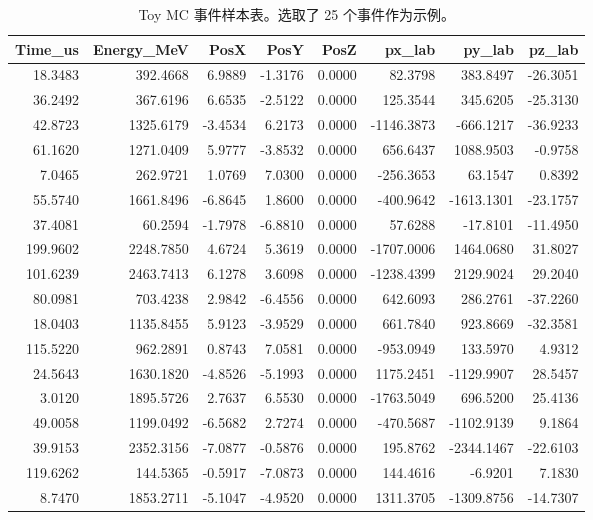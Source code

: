 \documentclass[a4paper,11pt,AutoFakeBold]{ctexart}
\begin{document}
\newpage
\begin{table}[htbp]
\centering
\caption{Toy MC 事件样本表。选取了 25 个事件作为示例。}
\label{event_sample_table}
\begin{tabular}{rrrrrrrr}
\hline
\hline
Time\_us & Energy\_MeV & PosX & PosY & PosZ & px\_lab & py\_lab & pz\_lab \\
\hline
\hline
18.3483 & 392.4668 & 6.9889 & -1.3176 & 0.0000 & 82.3798 & 383.8497 & -26.3051 \\
36.2492 & 367.6196 & 6.6535 & -2.5122 & 0.0000 & 125.3544 & 345.6205 & -25.3130 \\
42.8723 & 1325.6179 & -3.4534 & 6.2173 & 0.0000 & -1146.3873 & -666.1217 & -36.9233 \\
61.1620 & 1271.0409 & 5.9777 & -3.8532 & 0.0000 & 656.6437 & 1088.9503 & -0.9758 \\
7.0465 & 262.9721 & 1.0769 & 7.0300 & 0.0000 & -256.3653 & 63.1547 & 0.8392 \\
55.5740 & 1661.8496 & -6.8645 & 1.8600 & 0.0000 & -400.9642 & -1613.1301 & -23.1757 \\
37.4081 & 60.2594 & -1.7978 & -6.8810 & 0.0000 & 57.6288 & -17.8101 & -11.4950 \\
199.9602 & 2248.7850 & 4.6724 & 5.3619 & 0.0000 & -1707.0006 & 1464.0680 & 31.8027 \\
101.6239 & 2463.7413 & 6.1278 & 3.6098 & 0.0000 & -1238.4399 & 2129.9024 & 29.2040 \\
80.0981 & 703.4238 & 2.9842 & -6.4556 & 0.0000 & 642.6093 & 286.2761 & -37.2260 \\
18.0403 & 1135.8455 & 5.9123 & -3.9529 & 0.0000 & 661.7840 & 923.8669 & -32.3581 \\
115.5220 & 962.2891 & 0.8743 & 7.0581 & 0.0000 & -953.0949 & 133.5970 & 4.9312 \\
24.5643 & 1630.1820 & -4.8526 & -5.1993 & 0.0000 & 1175.2451 & -1129.9907 & 28.5457 \\
3.0120 & 1895.5726 & 2.7637 & 6.5530 & 0.0000 & -1763.5049 & 696.5200 & 25.4136 \\
49.0058 & 1199.0492 & -6.5682 & 2.7274 & 0.0000 & -470.5687 & -1102.9139 & 9.1864 \\
39.9153 & 2352.3156 & -7.0877 & -0.5876 & 0.0000 & 195.8762 & -2344.1467 & -22.6103 \\
119.6262 & 144.5365 & -0.5917 & -7.0873 & 0.0000 & 144.4616 & -6.9201 & 7.1830 \\
8.7470 & 1853.2711 & -5.1047 & -4.9520 & 0.0000 & 1311.3705 & -1309.8756 & -14.7307 \\

\end{tabular}
\end{table}
\end{document}

